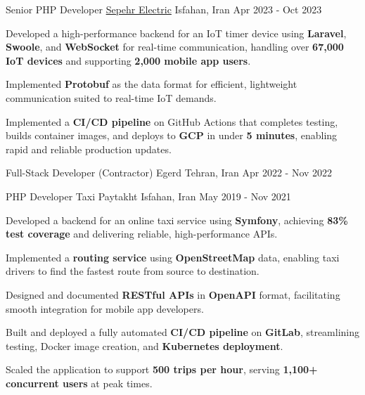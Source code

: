 \begin{cventries}
  \cventry
    {Senior PHP Developer} %
    {\href{https://www.hinics.com/}{Sepehr Electric}} %
    {Isfahan, Iran} %
    {Apr 2023 - Oct 2023} %
    {
      \begin{cvitems}
        \item {Developed a high-performance backend for an IoT timer device using \textbf{Laravel}, \textbf{Swoole}, and \textbf{WebSocket} for real-time communication, handling over \textbf{67,000 IoT devices} and supporting \textbf{2,000 mobile app users}.}
        \item {Implemented \textbf{Protobuf} as the data format for efficient, lightweight communication suited to real-time IoT demands.}
        \item {Implemented a \textbf{CI/CD pipeline} on GitHub Actions that completes testing, builds container images, and deploys to \textbf{GCP} in under \textbf{5 minutes}, enabling rapid and reliable production updates.}
      \end{cvitems}
    }
  
  \cventry
    {Full-Stack Developer (Contractor)} %
    {Egerd} %
    {Tehran, Iran} %
    {Apr 2022 - Nov 2022} %
    {}

  \cventry
    {PHP Developer} %
    {Taxi Paytakht} %
    {Isfahan, Iran} %
    {May 2019  - Nov 2021} %
    {
      \begin{cvitems}
        \item {Developed a backend for an online taxi service using \textbf{Symfony}, achieving \textbf{83\% test coverage} and delivering reliable, high-performance APIs.}
        \item {Implemented a \textbf{routing service} using \textbf{OpenStreetMap} data, enabling taxi drivers to find the fastest route from source to destination.}
        \item {Designed and documented \textbf{RESTful APIs} in \textbf{OpenAPI} format, facilitating smooth integration for mobile app developers.}
        \item {Built and deployed a fully automated \textbf{CI/CD pipeline} on \textbf{GitLab}, streamlining testing, Docker image creation, and \textbf{Kubernetes deployment}.}
        \item {Scaled the application to support \textbf{500 trips per hour}, serving \textbf{1,100+ concurrent users} at peak times.}
      \end{cvitems}
    }
  

\end{cventries}
